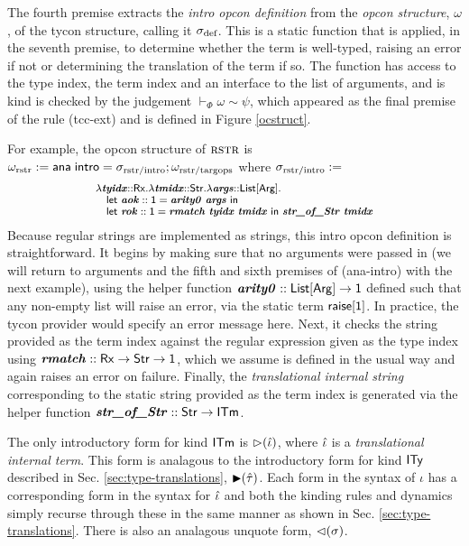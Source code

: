 \documentclass[10pt,preprint]{sigplanconf}
\begin{document}
The fourth premise extracts the \emph{intro opcon definition} from the \emph{opcon structure}, $\omega$, of the tycon structure, calling it $\sigma_\text{def}$. This is a static function that is applied, in the seventh premise, to determine whether the term is well-typed, raising an error if not or determining the translation of the term if so. The function has access to the type index, the term index and an interface to the list of arguments, and is kind is checked by the  judgement $\vdash_\Phi \omega \sim \psi$, which appeared as the final premise of the rule (tcc-ext) and is defined in Figure \ref{ocstruct}. 

For example, the opcon structure of $\textsc{rstr}$ is  $\small\omega_\text{rstr} := \tcstructn{\stx{rstr/intro}}; \omega_\text{rstr/targops}$ where $\small\stx{rstr/intro}:=$
\[\small\begin{array}{l}
    \slam{\krx}{\svar{tyidx}}{\slam{\kstr}{\svar{tmidx}}{\slam{\kargs}{\svar{args}}{\\
\quad \keyw{let}~\svar{aok} :: \kunit = \svar{arity0}~\svar{args}~\keyw{in}~\\
\quad \keyw{let}~\svar{rok} :: \kunit = \svar{rmatch}~\svar{tyidx}~\svar{tmidx}~\keyw{in}~\svar{str\_of\_Str}~\svar{tmidx}
}}}
\end{array}\]
Because regular strings are implemented as strings, this intro opcon definition is straightforward. It begins by making sure that no arguments were passed in (we will return to arguments and the fifth and sixth premises of (ana-intro) with the next example), using the helper function $\svar{arity0} :: \kargs \rightarrow \kunit$ defined such that any non-empty list will raise an error, via the static term ${\sf raise}[{\sf 1}]$. In practice, the tycon provider would specify an error message here. 
Next, it checks the string provided as the term index against the regular expression given as the type index using ${\textbf{\textit{rmatch}}} :: {\sf Rx} \rightarrow {\sf Str} \rightarrow {\sf 1}$, which we assume is defined in the usual way and again raises an error on failure. Finally, the \emph{translational internal string} corresponding to the static string provided as the term index is generated via the helper function $\svar{str\_of\_Str} :: \keyw{Str} \rightarrow \kitm$.%

The only introductory form for kind ${\sf ITm}$ is ${\rhd}(\hat{\iota})$, where $\hat{\iota}$ is a \emph{translational internal term}. This form is analagous to the introductory form for kind ${\sf ITy}$ described in Sec. \ref{sec:type-translations}, ${\blacktriangleright}(\hat{\tau})$. Each form in the syntax of $\iota$ has a corresponding form in the syntax for $\hat{\iota}$ and both the kinding rules and dynamics simply recurse through these in the same manner as shown in Sec. \ref{sec:type-translations}. There is also an analagous unquote form, ${\lhd}(\sigma)$. %
\end{document}
